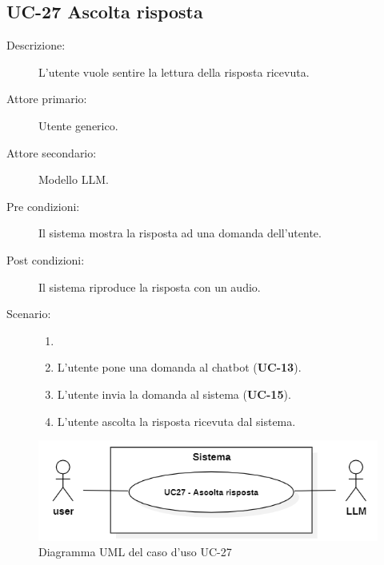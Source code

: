 \subsection{UC-27 Ascolta risposta}
\begin{description}
    \item[Descrizione:] L'utente vuole sentire la lettura della risposta ricevuta.
    \item[Attore primario:] Utente generico.
    \item[Attore secondario:] Modello LLM.
    \item[Pre condizioni:] Il sistema mostra la risposta ad una domanda dell'utente.
    \item[Post condizioni:] Il sistema riproduce la risposta con un audio.
    \item[Scenario:]
    \begin{enumerate}
        \item[]
        \item L’utente pone una domanda al chatbot (\textbf{UC-13}).
        \item L'utente invia la domanda al sistema (\textbf{UC-15}).
        \item L'utente ascolta la risposta ricevuta dal sistema.
    \end{enumerate}
\end{description}

\begin{figure}[H]
    \centering
    \includegraphics[width=0.9\linewidth]{UC27.png} %
    \caption{Diagramma UML del caso d'uso UC-27}
    \label{fig:UC33}
\end{figure}